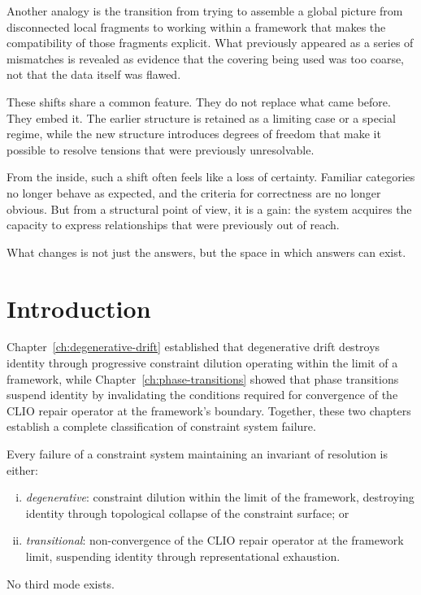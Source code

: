 \documentclass[11pt,openany]{book}
\begin{document}
Another analogy is the transition from trying to assemble a
global picture from disconnected local fragments to working
within a framework that makes the compatibility of those
fragments explicit.  What previously appeared as a series of
mismatches is revealed as evidence that the covering being
used was too coarse, not that the data itself was flawed.

These shifts share a common feature.  They do not replace
what came before.  They embed it.  The earlier structure is
retained as a limiting case or a special regime, while the
new structure introduces degrees of freedom that make it
possible to resolve tensions that were previously
unresolvable.

From the inside, such a shift often feels like a loss of
certainty.  Familiar categories no longer behave as expected,
and the criteria for correctness are no longer obvious.  But
from a structural point of view, it is a gain: the system
acquires the capacity to express relationships that were
previously out of reach.

What changes is not just the answers, but the space in which
answers can exist.

\section{Introduction}
\label{sec:intro-medium}

Chapter~\ref{ch:degenerative-drift} established that
degenerative drift destroys identity through progressive
constraint dilution operating within the limit of a
framework, while Chapter~\ref{ch:phase-transitions} showed
that phase transitions suspend identity by invalidating the
conditions required for convergence of the CLIO repair
operator at the framework's boundary.  Together, these two
chapters establish a complete classification of constraint
system failure.

\begin{proposition}
\label{prop:completeness}
Every failure of a constraint system maintaining an
invariant of resolution is either:
\begin{enumerate}[(i)]
  \item \emph{degenerative}: constraint dilution within
    the limit of the framework, destroying identity through
    topological collapse of the constraint surface; or
  \item \emph{transitional}: non-convergence of the CLIO
    repair operator at the framework limit, suspending
    identity through representational exhaustion.
\end{enumerate}
No third mode exists.
\end{proposition}
\end{document}
